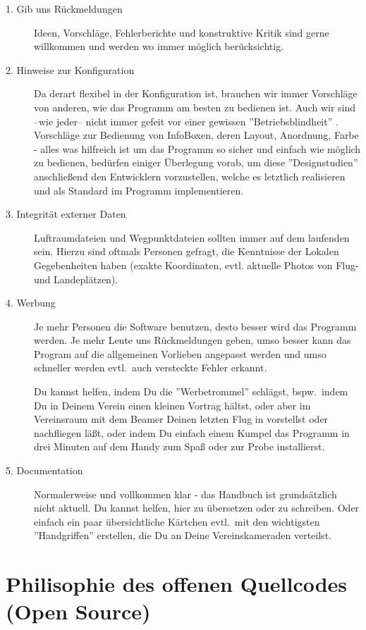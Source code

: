 \begin{description}
\item[1. Gib uns Rückmeldungen] Ideen, Vorschläge, Fehlerberichte und konstruktive Kritik sind gerne willkommen und werden
wo immer möglich berücksichtig.
\item[2. Hinweise zur Konfiguration] Da \xc derart flexibel in der Konfiguration ist, brauchen wir immer Vorschläge von anderen, wie
das Programm am besten zu bedienen ist. Auch wir sind --wie jeder-- nicht immer gefeit vor einer gewissen ''Betriebsblindheit'' .
Vorschläge zur Bedienung von InfoBoxen, deren Layout, Anordnung, Farbe - alles was hilfreich ist um das Programm so sicher
und einfach wie möglich zu bedienen, bedürfen einiger Überlegung vorab, um diese ''Designstudien'' anschließend den Entwicklern
vorzustellen, welche es letztlich realisieren und als Standard im Programm implementieren.
\item[3. Integrität externer Daten] Luftraumdateien und Wegpunktdateien sollten immer auf dem laufenden sein.
Hierzu sind oftmals Personen gefragt, die Kenntnisse der Lokalen Gegebenheiten haben (exakte Koordinaten, evtl. aktuelle Photos von Flug- und Landeplätzen).
\item[4. Werbung]  Je mehr Personen die Software benutzen, desto besser wird das Programm werden. Je mehr Leute uns Rückmeldungen geben, umso
besser kann das Program auf die allgemeinen Vorlieben angepasst werden und umso schneller werden evtl.\ auch versteckte Fehler erkannt.

Du kannst helfen, indem Du die ''Werbetrommel'' schlägst, bspw.\ indem Du in Deinem Verein einen kleinen Vortrag hältst, oder aber im Vereinsraum mit
dem Beamer Deinen letzten Flug in \xc vorstellst oder nachfliegen läßt, oder indem Du einfach einem Kumpel das Programm in drei Minuten auf
dem Handy zum Spaß oder zur Probe installierst.
\item[5. Documentation]  Normalerweise und vollkommen klar - das Handbuch ist grundsätzlich nicht aktuell. Du kannst helfen, hier zu übersetzen oder zu
schreiben. Oder einfach ein paar übersichtliche Kärtchen evtl.\ mit den wichtigsten ''Handgriffen'' erstellen, die Du an Deine Vereinskameraden
verteilst.
\end{description}

\section{Philisophie des offenen Quellcodes (Open Source)}

